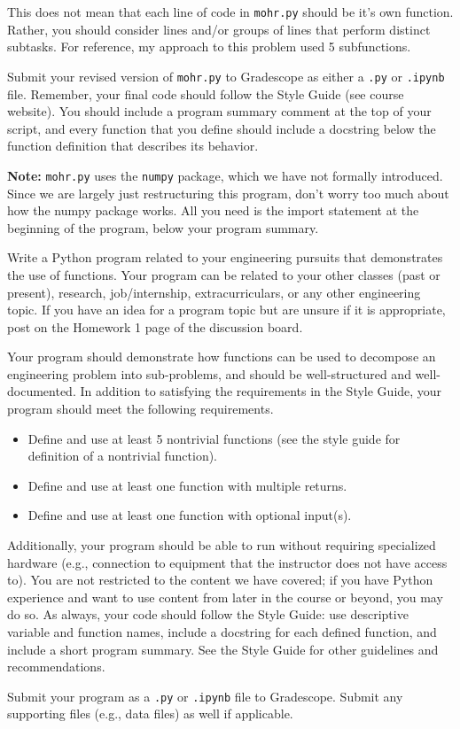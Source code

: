\documentclass{homework}
\begin{document}
This does not mean that each line of code in \texttt{mohr.py} should be it's own function. Rather, you should consider lines and/or groups of lines that perform distinct subtasks. For reference, my approach to this problem used 5 subfunctions.

Submit your revised version of \texttt{mohr.py} to Gradescope as either a \texttt{.py} or \texttt{.ipynb} file. Remember, your final code should follow the Style Guide (see course website). You should include a program summary comment at the top of your script, and every function that you define should include a docstring below the function definition that describes its behavior.

\textbf{Note:} \texttt{mohr.py} uses the \texttt{numpy} package, which we have not formally introduced. Since we are largely just restructuring this program, don't worry too much about how the numpy package works. All you need is the import statement at the beginning of the program, below your program summary.

\newpage
{}

Write a Python program related to your engineering pursuits that demonstrates the use of functions. Your program can be related to your other classes (past or present), research, job/internship, extracurriculars, or any other engineering topic. If you have an idea for a program topic but are unsure if it is appropriate, post on the Homework 1 page of the discussion board.

Your program should demonstrate how functions can be used to decompose an engineering problem into sub-problems, and should be well-structured and well-documented. In addition to satisfying the requirements in the Style Guide, your program should meet the following requirements.

\begin{itemize}
    \item Define and use at least 5 nontrivial functions (see the style guide for definition of a nontrivial function).
    \item Define and use at least one function with multiple returns.
    \item Define and use at least one function with optional input(s).
\end{itemize}

Additionally, your program should be able to run without requiring specialized hardware (e.g., connection to equipment that the instructor does not have access to). You are not restricted to the content we have covered; if you have Python experience and want to use content from later in the course or beyond, you may do so. As always, your code should follow the Style Guide: use descriptive variable and function names, include a docstring for each defined function, and include a short program summary. See the Style Guide for other guidelines and recommendations.

Submit your program as a \texttt{.py} or \texttt{.ipynb} file to Gradescope. Submit any supporting files (e.g., data files) as well if applicable.
\end{document}
